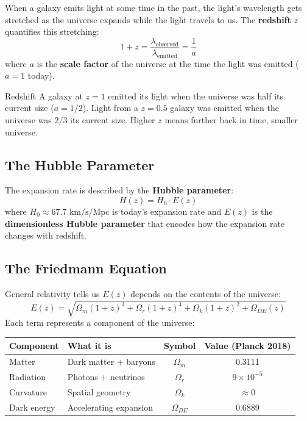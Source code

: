 \documentclass[11pt,a4paper]{article}
\begin{document}
When a galaxy emits light at some time in the past, the light's wavelength gets stretched as the universe expands while the light travels to us. The \textbf{redshift} $z$ quantifies this stretching:
\begin{equation}
1 + z = \frac{\lambda_{\text{observed}}}{\lambda_{\text{emitted}}} = \frac{1}{a}
\end{equation}
where $a$ is the \textbf{scale factor} of the universe at the time the light was emitted ($a=1$ today).

\begin{examplebox}{Redshift}
A galaxy at $z = 1$ emitted its light when the universe was half its current size ($a = 1/2$). Light from a $z = 0.5$ galaxy was emitted when the universe was $2/3$ its current size. Higher $z$ means further back in time, smaller universe.
\end{examplebox}

\subsection{The Hubble Parameter}

The expansion rate is described by the \textbf{Hubble parameter}:
\begin{equation}
H(z) = H_0 \cdot E(z)
\end{equation}
where $H_0 \approx 67.7 \text{ km/s/Mpc}$ is today's expansion rate and $E(z)$ is the \textbf{dimensionless Hubble parameter} that encodes how the expansion rate changes with redshift.

\subsection{The Friedmann Equation}

General relativity tells us $E(z)$ depends on the contents of the universe:
\begin{equation}
\boxed{E(z) = \sqrt{\Omega_m (1+z)^3 + \Omega_r (1+z)^4 + \Omega_k (1+z)^2 + \Omega_{DE}(z)}}
\label{eq:friedmann}
\end{equation}
Each term represents a component of the universe:

\begin{center}
\begin{tabular}{llcc}
\toprule
\textbf{Component} & \textbf{What it is} & \textbf{Symbol} & \textbf{Value (Planck 2018)} \\
\midrule
Matter & Dark matter + baryons & $\Omega_m$ & 0.3111 \\
Radiation & Photons + neutrinos & $\Omega_r$ & $9 \times 10^{-5}$ \\
Curvature & Spatial geometry & $\Omega_k$ & $\approx 0$ \\
Dark energy & Accelerating expansion & $\Omega_{DE}$ & 0.6889 \\
\bottomrule
\end{tabular}
\end{center}
\end{document}
